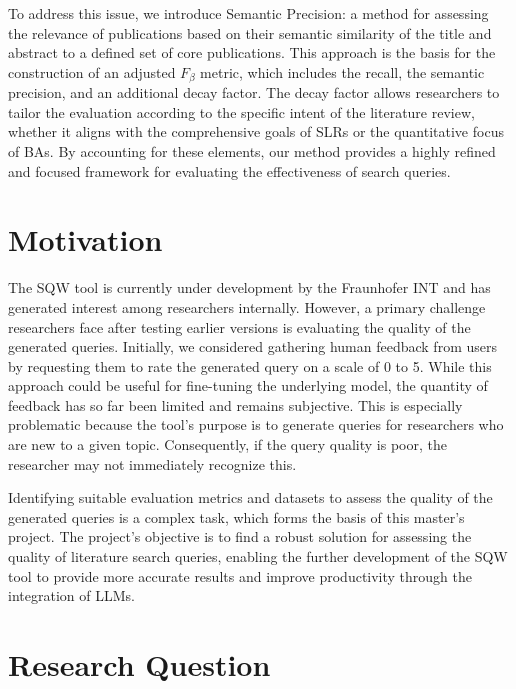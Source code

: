 To address this issue, we introduce Semantic Precision: a method for assessing the relevance of publications based on their semantic similarity of the title and abstract to a defined set of core publications. This approach is the basis for the construction of an adjusted $F_\beta$ metric, which includes the recall, the semantic precision, and an additional decay factor. The decay factor allows researchers to tailor the evaluation according to the specific intent of the literature review, whether it aligns with the comprehensive goals of SLRs or the quantitative focus of BAs. By accounting for these elements, our method provides a highly refined and focused framework for evaluating the effectiveness of search queries.

\section{Motivation}
The SQW tool is currently under development by the Fraunhofer INT and has generated interest among researchers internally. However, a primary challenge researchers face after testing earlier versions is evaluating the quality of the generated queries. Initially, we considered gathering human feedback from users by requesting them to rate the generated query on a scale of 0 to 5. While this approach could be useful for fine-tuning the underlying model, the quantity of feedback has so far been limited and remains subjective. This is especially problematic because the tool’s purpose is to generate queries for researchers who are new to a given topic. Consequently, if the query quality is poor, the researcher may not immediately recognize this.

Identifying suitable evaluation metrics and datasets to assess the quality of the generated queries is a complex task, which forms the basis of this master's project. The project’s objective is to find a robust solution for assessing the quality of literature search queries, enabling the further development of the SQW tool to provide more accurate results and improve productivity through the integration of LLMs.


\section{Research Question}\label{sec:researchQuestions}

